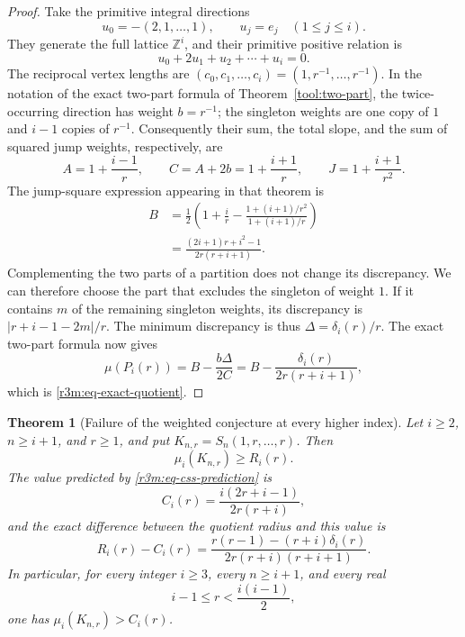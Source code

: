 \documentclass[11pt,a4paper]{article}
\newtheorem{theorem}{Theorem}[section]
\theoremstyle{remark}\newtheorem{remark}[theorem]{Remark}
\begin{document}
\begin{proof}
Take the primitive integral directions
\[
 u_0=-(2,1,\ldots,1),\qquad u_j=e_j\quad(1\le j\le i).
\]
They generate the full lattice $\mathbb Z^i$, and their primitive
positive relation is
\[
 u_0+2u_1+u_2+\cdots+u_i=0.
\]
The reciprocal vertex lengths are
$(c_0,c_1,\ldots,c_i)=(1,r^{-1},\ldots,r^{-1})$.
In the notation of the exact two-part formula
of Theorem~\ref{tool:two-part}, the twice-occurring direction has
weight $b=r^{-1}$; the singleton weights are one copy of $1$ and
$i-1$ copies of $r^{-1}$.  Consequently their sum, the total slope,
and the sum of squared jump weights, respectively, are
\[
 A=1+\frac{i-1}{r},\qquad
 C=A+2b=1+\frac{i+1}{r},\qquad
 J=1+\frac{i+1}{r^2}.
\]
The jump-square expression appearing in that theorem is
\begin{align*}
 B
 &=\frac12\left(
       1+\frac{i}{r}
       -\frac{1+(i+1)/r^2}{1+(i+1)/r}
            \right)\\
 &=\frac{(2i+1)r+i^2-1}{2r(r+i+1)}.
\end{align*}
Complementing the two parts of a partition does not change its
discrepancy.  We can therefore choose the part that excludes the
singleton of weight $1$.  If it contains $m$ of the remaining
singleton weights, its discrepancy is
$|r+i-1-2m|/r$.  The minimum discrepancy is thus
$\Delta=\delta_i(r)/r$.
The exact two-part formula now gives
\[
 \mu(P_i(r))
 =B-\frac{b\Delta}{2C}
 =B-\frac{\delta_i(r)}{2r(r+i+1)},
\]
which is \eqref{r3m:eq-exact-quotient}.
\end{proof}

\begin{theorem}[Failure of the weighted conjecture at every higher index]
\label{r3m:thm-counterexamples}
Let $i\ge2$, $n\ge i+1$, and $r\ge1$, and put
$K_{n,r}=S_n(1,r,\ldots,r)$.  Then
\begin{equation}
\label{r3m:eq-global-lower}
 \mu_i(K_{n,r})\ge R_i(r).
\end{equation}
The value predicted by \eqref{r3m:eq-css-prediction} is
\[
 C_i(r)=\frac{i(2r+i-1)}{2r(r+i)},
\]
and the exact difference between the quotient radius and this value is
\begin{equation}
\label{r3m:eq-general-gap}
 R_i(r)-C_i(r)=
 \frac{r(r-1)-(r+i)\delta_i(r)}
      {2r(r+i)(r+i+1)}.
\end{equation}
In particular, for every integer $i\ge3$, every $n\ge i+1$, and every real
\begin{equation}
\label{r3m:eq-counterexample-interval}
 i-1\le r<\frac{i(i-1)}2,
\end{equation}
one has $\mu_i(K_{n,r})>C_i(r)$.
\end{theorem}
\end{document}

